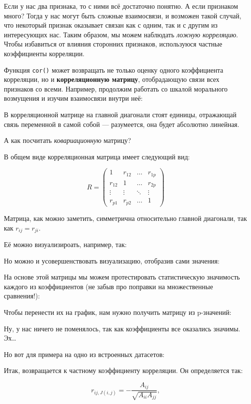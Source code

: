 \documentclass[
  letterpaper,
]{scrbook}
\theoremstyle{definition}
\theoremstyle{remark}
\begin{document}
Если у нас два признака, то с ними всё достаточно понятно. А если
признаком много? Тогда у нас могут быть сложные взаимосвязи, и возможен
такой случай, что некоторый признак оказывает связан как с одним, так и
с другим из интересующих нас. Таким образом, мы можем наблюдать
\emph{ложную корреляцию}. Чтобы избавиться от влияния сторонних
признаков, используюся частные коэффициенты корреляции.

Функция \texttt{cor()} может возвращать не только оценку одного
коэффициента корреляции, но и \textbf{корреляционную матрицу},
отобрадающую связи всех признаков со всеми. Например, продолжим работать
со шкалой морального возмущения и изучим взаимосвязи внутри неё:

В корреляционной матрице на главной диагонали стоят единицы, отражающай
связь переменной в самой собой --- разумеется, она будет абсолютно
линейная.

А как посчитать \emph{ковариационную} матрицу?

В общем виде корреляционная матрица имеет следующий вид:

\[
R = 
\begin{pmatrix}
1 & r_{12} & \dots & r_{1p} \\
r_{12} & 1 & \dots & r_{2p} \\
\vdots & \vdots & \ddots & \vdots \\
r_{p1} & r_{p2} & \dots & 1
\end{pmatrix}
\]

Матрица, как можно заметить, симметрична относительно главной диагонали,
так как \(r_{ij} = r_{ji}\).

Её можно визуализироать, например, так:

Но можно и усовершенствовать визуализацию, отобразив сами значения:

На основе этой матрицы мы можем протестировать статистическую значимость
каждого из коэффициентов (не забыв про поправки на множественные
сравнения!):

Чтобы перенести их на график, нам нужно получить матрицу из p-значений:

Ну, у нас ничего не поменялось, так как коэффициенты все оказались
значимы. Эх\ldots{}

Но вот для примера на одно из встроенных датасетов:

Итак, возвращается к частному коэффициенту корреляции. Он определяется
так:

\[
r_{ij, J(i,j)} = - \frac{A_{ij}}{\sqrt{A_{ii} A_{jj}}},
\]
\end{document}
